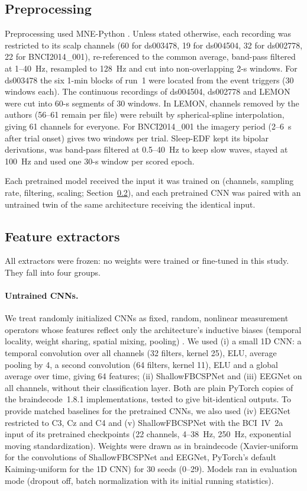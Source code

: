\documentclass[11pt]{article}
\begin{document}
\subsection{Preprocessing}
Preprocessing used MNE-Python \citep{gramfort2013}. Unless stated otherwise, each recording was
restricted to its scalp channels (60 for ds003478, 19 for ds004504, 32 for ds002778, 22 for
BNCI2014\_001), re-referenced to the common average, band-pass filtered at 1--40~Hz, resampled to
128~Hz and cut into non-overlapping 2-s windows. For ds003478 the six 1-min blocks of run~1 were
located from the event triggers (30 windows each). The continuous recordings of ds004504,
ds002778 and LEMON were cut into 60-s segments of 30 windows. In LEMON, channels removed by the
authors (56--61 remain per file) were rebuilt by spherical-spline interpolation, giving 61
channels for everyone. For BNCI2014\_001 the imagery period (2--6~s after trial onset) gives two
windows per trial. Sleep-EDF kept its bipolar derivations, was band-pass filtered at 0.5--40~Hz
to keep slow waves, stayed at 100~Hz and used one 30-s window per scored epoch.

Each pretrained model received the input it was trained on (channels, sampling rate, filtering,
scaling; Section~\ref{sec:extractors}), and each pretrained CNN was paired with an untrained twin
of the same architecture receiving the identical input.

\subsection{Feature extractors}\label{sec:extractors}
All extractors were frozen: no weights were trained or fine-tuned in this study. They fall into
four groups.

\paragraph{Untrained CNNs.} We treat randomly initialized CNNs as fixed, random, nonlinear
measurement operators whose features reflect only the architecture's inductive biases (temporal
locality, weight sharing, spatial mixing, pooling) \citep{saxe2011}. We used (i) a small 1D CNN:
a temporal convolution over all channels (32 filters, kernel 25), ELU, average pooling by 4, a
second convolution (64 filters, kernel 11), ELU and a global average over time, giving 64
features; (ii) ShallowFBCSPNet \citep{schirrmeister2017} and (iii) EEGNet \citep{lawhern2018}
on all channels, without their classification layer. Both are plain PyTorch copies of the
braindecode~1.8.1 implementations, tested to give bit-identical outputs. To provide matched
baselines for the pretrained CNNs, we also used (iv) EEGNet restricted to C3, Cz and C4 and
(v) ShallowFBCSPNet with the BCI~IV~2a input of its pretrained checkpoints (22 channels, 4--38~Hz,
250~Hz, exponential moving standardization). Weights were drawn as in braindecode (Xavier-uniform
for the convolutions of ShallowFBCSPNet and EEGNet, PyTorch's default Kaiming-uniform for the
1D CNN) for 30 seeds (0--29). Models ran in evaluation mode (dropout off, batch normalization with
its initial running statistics).
\end{document}
